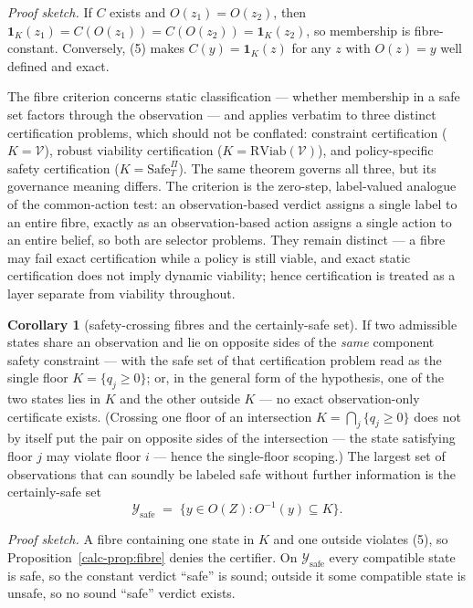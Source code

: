 \documentclass[10pt,twocolumn]{article}
\theoremstyle{definition}
\newtheorem{corollary}{Corollary}
\begin{document}
\emph{Proof sketch.} If \(C\) exists and \(O(z_1) = O(z_2)\), then \(\mathbf{1}_K(z_1) = C(O(z_1)) = C(O(z_2)) = \mathbf{1}_K(z_2)\), so membership is fibre-constant. Conversely, (5) makes \(C(y) = \mathbf{1}_K(z)\) for any \(z\) with \(O(z) = y\) well defined and exact.

The fibre criterion concerns static classification --- whether
membership in a safe set factors through the observation --- and applies
verbatim to three distinct certification problems, which should not be
conflated: constraint certification (\(K = \mathcal{V}\)), robust
viability certification (\(K = \mathrm{RViab}(\mathcal{V})\)), and
policy-specific safety certification (\(K = \mathrm{Safe}^{\Pi}_T\)).
The same theorem governs all three, but its governance meaning differs.
The criterion is the zero-step, label-valued analogue of the
common-action test: an observation-based verdict assigns a single label
to an entire fibre, exactly as an observation-based action assigns a
single action to an entire belief, so both are selector problems. They
remain distinct --- a fibre may fail exact certification while a policy
is still viable, and exact static certification does not imply dynamic
viability; hence certification is treated as a layer separate from
viability throughout.

\begin{corollary}[safety-crossing fibres and the certainly-safe set]\label{calc-cor:certainly-safe} If two admissible states share an observation and lie on opposite
sides of the \emph{same} component safety constraint --- with the safe
set of that certification problem read as the single floor
\(K = \{ q_j \ge 0 \}\); or, in the general form of the hypothesis, one
of the two states lies in \(K\) and the other outside \(K\) --- no exact
observation-only certificate exists. (Crossing one floor of an
intersection \(K = \bigcap_j \{ q_j \ge 0 \}\) does not by itself put
the pair on opposite sides of the intersection --- the state satisfying
floor \(j\) may violate floor \(i\) --- hence the single-floor scoping.)
The largest set of observations that can soundly be labeled safe without
further information is the certainly-safe set
\[\mathcal{Y}_{\mathrm{safe}} \;=\; \big\{ y \in O(Z) : O^{-1}(y) \subseteq K \big\}.\]

\end{corollary}

\emph{Proof sketch.} A fibre containing one state in \(K\) and one outside violates (5), so Proposition~\ref{calc-prop:fibre} denies the certifier. On \(\mathcal{Y}_{\mathrm{safe}}\) every compatible state is safe, so the constant verdict ``safe'' is sound; outside it some compatible state is unsafe, so no sound ``safe'' verdict exists.
\end{document}
